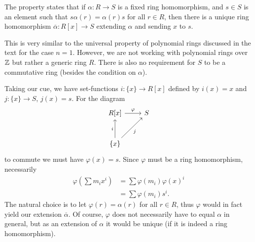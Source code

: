 \begin{solution}
	The property states that if $\alpha: R \to S$ is a fixed ring homomorphism, and $s \in S$ is an element such that $s \alpha(r) = \alpha(r) s$ for all $r \in R$, then there is a unique ring homomorphism $\overline{\alpha}: R[x] \to S$ extending $\alpha$ and sending $x$ to $s$.
	
	This is very similar to the universal property of polynomial rings discussed in the text for the case $n = 1$. However, we are not working with polynomial rings over $\mathbb{Z}$ but rather a generic ring $R$. There is also no requirement for $S$ to be a commutative ring (besides the condition on $\alpha$).
	
	Taking our cue, we have set-functions $i: \{x\} \to R[x]$ defined by $i(x) = x$ and $j: \{x\} \to S$, $j(x) = s$. For the diagram
	\begin{equation*}
		\begin{tikzcd}[row sep=large]
			R[x]
			\arrow[r, "\varphi"]
			& S \\
			\{x\}
			\arrow[u, "i"]
			\arrow[ur, "j"']
		\end{tikzcd}
	\end{equation*}
	to commute we must have $\varphi(x) = s$. Since $\varphi$ must be a ring homomorphism, necessarily
	\begin{align*}
		\varphi(\sum m_i x^i) &= \sum \varphi(m_i) \varphi(x)^i \\
		&= \sum \varphi(m_i) s^i \text{.}
	\end{align*}
	The natural choice is to let $\varphi(r) = \alpha(r)$ for all $r \in R$, thus $\varphi$ would in fact yield our extension $\overline{\alpha}$. Of course, $\varphi$ does not necessarily have to equal $\alpha$ in general, but as an extension of $\alpha$ it would be unique (if it is indeed a ring homomorphism).
	

\end{solution}
